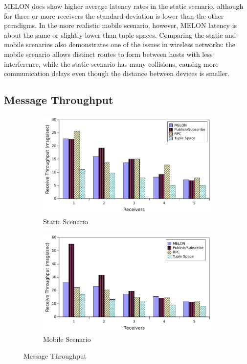 \documentclass[lnicst]{svmultln}
\begin{document}
MELON does show higher average latency rates in the static scenario, although for three or more receivers the standard deviation is lower than the other paradigms. In the more realistic mobile scenario, however, MELON latency is about the same or slightly lower than tuple spaces. Comparing the static and mobile scenarios also demonstrates one of the issues in wireless networks: the mobile scenario allows distinct routes to form between hosts with less interference, while the static scenario has many collisions, causing more communication delays even though the distance between devices is smaller.

\subsection{Message Throughput}

\begin{figure}
\centering

\begin{subfigure}{.5\textwidth}
\centering
\includegraphics[width = \linewidth, clip, trim = 0px 0px 0px 0px]{figures/throughput_static.pdf}
\caption{Static Scenario}
\label{fig:throughputstatic}
\end{subfigure}%
\begin{subfigure}{.5\textwidth}
\centering
\includegraphics[width = \linewidth, clip, trim = 0px 0px 0px 0px]{figures/throughput_mobile.pdf}
\caption{Mobile Scenario}
\label{fig:throughputmobile}
\end{subfigure}
\caption{Message Throughput}
\end{figure}
\end{document}
